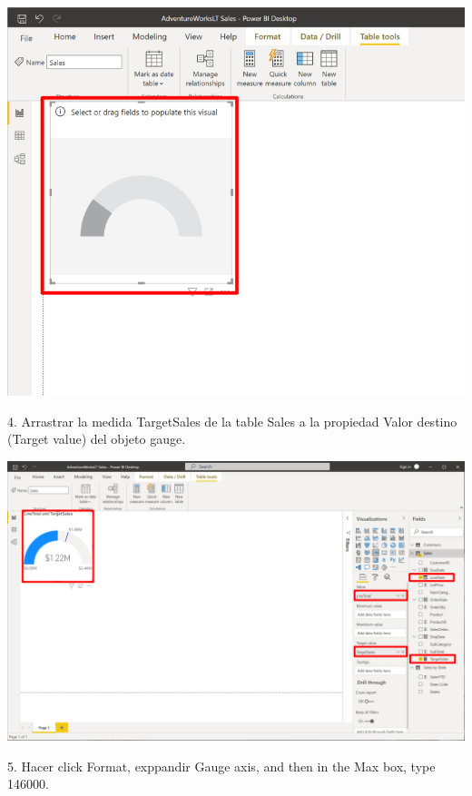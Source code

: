 \documentclass[12pt,letterpaper]{article}
\begin{document}
\begin{center}
    \includegraphics[width=15cm]{img/73.png}
    \vspace{1cm}
\end{center}
4. Arrastrar la medida TargetSales de la table Sales a la propiedad Valor destino (Target value) del objeto
gauge.
\begin{center}
    \includegraphics[width=17cm]{img/74.png}
\end{center}
5. Hacer click Format, exppandir Gauge axis, and then in the Max box, type 146000.
\end{document}
